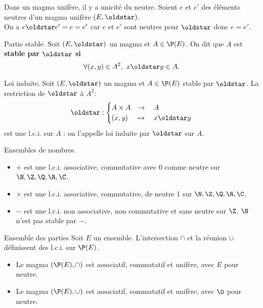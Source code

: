 \documentclass[11pt]{article}
\begin{document}
\begin{prop}{}{}
    Dans un magma unifère, il y a unicité du neutre.
    \tcblower
    Soient $e$ et $e'$ des éléments neutres d'un magma unifère $(E,\s)$.\\
    On a $e\s e' = e = e'$ car $e$ et $e'$ sont neutres pour $\s$ donc $e=e'$.
\end{prop}

\begin{defi}{Partie stable.}{}
    Soit $(E,\s)$ un magma et $A\in\P(E)$. On dit que $A$ est \bf{stable} par $\s$ si
    \begin{equation*}
        \forall (x,y) \in A^2, ~ x \s y \in A.
    \end{equation*}
\end{defi}

\vspace*{-0.1cm}

\begin{defi}{Loi induite.}{}
    Soit $(E,\s)$ un magma et $A\in\P(E)$ stable par $\s$. La restriction de $\s$ à $A^2$:
    \begin{equation*}
        \s : \begin{cases}
            A\times A &\to \quad A\\
            (x,y)&\mapsto\quad x\s y
        \end{cases}
    \end{equation*}
    est une l.c.i. sur $A$ : on l'appelle loi induite par $\s$ sur $A$.
\end{defi}

\vspace*{-0.1cm}

\begin{ex}{Ensembles de nombres.}{}
    \begin{itemize}
        \item $+$ est une l.c.i. associative, commutative avec 0 comme neutre sur $\N,\Z,\Q,\R,\C$.
        \item $\times$ est une l.c.i. associative, commutative, de neutre 1 sur $\N,\Z,\Q,\R,\C$.
        \item $-$ est une l.c.i. non associative, non commutative et sans neutre sur $\Z$. $\N$ n'est pas stable par $-$.
    \end{itemize}
\end{ex}

\vspace*{-0.1cm}

\begin{ex}{Ensemble des parties}{}
    Soit $E$ un ensemble. L'intersection $\cap$ et la réunion $\cup$ définissent des l.c.i. sur $\P(E)$.
    \begin{itemize}
        \item Le magma $(\P(E),\cap)$ est associatif, commutatif et unifère, avec $E$ pour neutre.
        \item Le magma $(\P(E),\cup)$ est associatif, commutatif et unifère, avec $\0$ pour neutre.
    \end{itemize}
\end{ex}
\end{document}
